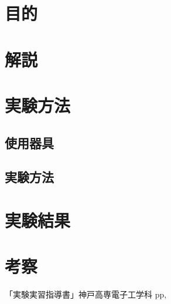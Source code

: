\documentclass[11pt]{jarticle}
\title{}
\begin{document}
\maketitle

\section{目的}

\section{解説}
	\subsection{}
\section{実験方法}
	\subsection{使用器具}
	\subsection{実験方法}
\section{実験結果}
\section{考察}
\begin{thebibliography}{99}
「実験実習指導書」神戸高専電子工学科 pp,
\end{thebibliography}
\end{document}
